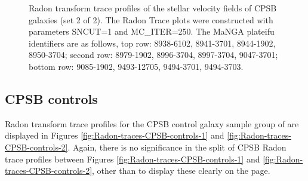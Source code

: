 \documentclass[fleqn,usenatbib]{mnras}
\begin{document}
\begin{figure}
    \caption{Radon transform trace profiles of the stellar velocity fields of CPSB galaxies (set 2 of 2). The Radon Trace plots were constructed with parameters SNCUT=1 and MC\_ITER=250. The MaNGA plateifu identifiers are as follows, top row: 8938-6102, 8941-3701, 8944-1902, 8950-3704; second row: 8979-1902, 8996-3704, 8997-3704, 9047-3701; bottom row: 9085-1902, 9493-12705, 9494-3701, 9494-3703.}
    \label{fig:Radon-traces-CPSBs-2-SN1-MC250}
\end{figure}


\subsection{CPSB controls}
\label{sec:CPSB_controls}

Radon transform trace profiles for the CPSB control galaxy sample group of are displayed in Figures \ref{fig:Radon-traces-CPSB-controls-1} and \ref{fig:Radon-traces-CPSB-controls-2}. Again, there is no significance in the split of CPSB Radon trace profiles between Figures \ref{fig:Radon-traces-CPSB-controls-1} and \ref{fig:Radon-traces-CPSB-controls-2}, other than to display these clearly on the page.
\end{document}
